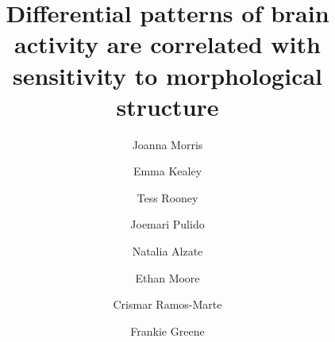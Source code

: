 \documentclass[preprint,12pt, authoryear, review]{elsarticle}
\begin{document}
	
	\begin{frontmatter}


	\title{Differential patterns of brain activity are correlated with sensitivity to morphological structure}


	\author[pc]{Joanna Morris}
	\author[usc]{Emma Kealey}
	\author[columbia]{Tess Rooney}
	\author[brown]{Joemari Pulido}
	\author[pc]{Natalia Alzate}
	\author[pc]{Ethan Moore}
	\author[pc]{Crismar Ramos-Marte}
	\author[ohsu]{Frankie Greene}
	
	\address[pc]{Department of Psychology, Providence College, Providence, RI, USA}
	\address[usc]{Department of Linguistics, University of Southern California, Los Angeles, CA, USA}
	\address[columbia]{Columbia University School of Nursing, New York, NY, USA}
	\address[brown]{Department of Cognitive, Linguistic \& Psychological Sciences, Brown University, Providence, RI, USA}
	\address[ohsu]{Oregon Health \& Science University and Portland State University School of Public Health, Portland, OR, USA}
	



\end{frontmatter}
\end{document}
